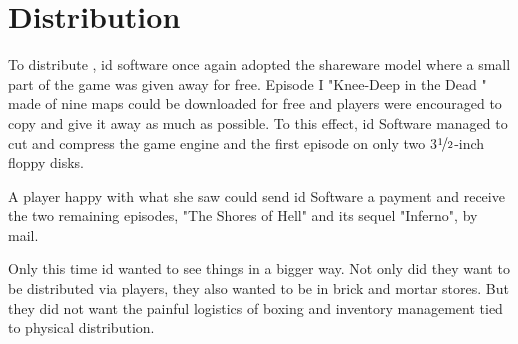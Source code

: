 \section{Distribution}
To distribute \doom, id software once again adopted the shareware model where a small part of the game was given away for free. Episode I "Knee-Deep in the Dead " made of nine maps could be downloaded for free and players were encouraged to copy and give it away as much as possible. To this effect, id Software managed to cut and compress the game engine and the first episode on only two 3$\nicefrac{1}{2}$-inch floppy disks.\\
\par 
A player happy with what she saw could send id Software a payment and receive the two remaining episodes, "The Shores of Hell" and its sequel "Inferno", by mail.\\
\par
{}
\par
Only this time id wanted to see things in a bigger way. Not only did they want to be distributed via players, they also wanted to be in brick and mortar stores. But they did not want the painful logistics of boxing and inventory management tied to physical distribution.\newpage





